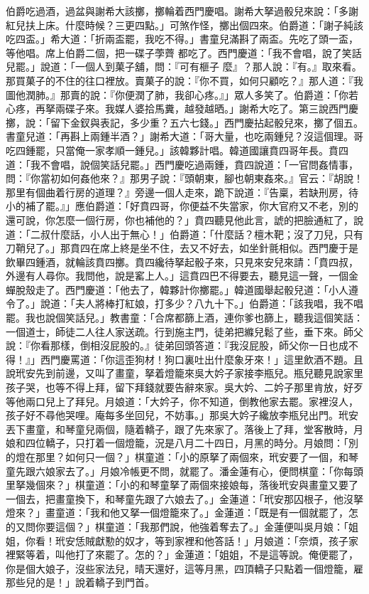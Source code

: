 \begin{showcontents}{}
伯爵吃過酒，過盆與謝希大該擲，擲輪着西門慶唱。謝希大拏過骰兒來說：「多謝紅兒扶上床。什麼時候？三更四點。」可煞作怪，擲出個四來。伯爵道：「謝子純該吃四盃。」希大道：「折兩盃罷，我吃不得。」書童兒滿斟了兩盃。先吃了頭一盃，等他唱。席上伯爵二個，把一碟子荸薺 都吃了。西門慶道：「我不會唱，說了笑話兒罷。」說道：「一個人到菓子舖，問：『可有榧子 麼』？那人說：『有。』取來看。那買菓子的不住的往口裡放。賣菓子的說：『你不買，如何只顧吃？』那人道：『我圖他潤肺。』那賣的說：『你便潤了肺，我卻心疼。』」眾人多笑了。伯爵道：「你若心疼，再拏兩碟子來。我媒人婆拾馬糞，越發越晒。」謝希大吃了。第三說西門慶擲，說：「留下金釵與表記，多少重？五六七錢。」西門慶拈起骰兒來，擲了個五。書童兒道：「再斟上兩鍾半酒？」謝希大道：「哥大量，也吃兩鍾兒？沒這個理。哥吃四鍾罷，只當俺一家孝順一鍾兒。」該韓夥計唱。韓道國讓賁四哥年長。賁四道：「我不會唱，說個笑話兒罷。」西門慶吃過兩鍾，賁四說道：「一官問姦情事，問：『你當初如何姦他來？』那男子說：『頭朝東，腳也朝東姦來。』官云：『胡說！那里有個曲着行房的道理？』旁邊一個人走來，跪下說道：『告稟，若缺刑房，待小的補了罷。』」應伯爵道：「好賁四哥，你便益不失當家，你大官府又不老，別的還可說，你怎麼一個行房，你也補他的？」賁四聽見他此言，諕的把臉通紅了，說道：「二叔什麼話，小人出于無心！」伯爵道：「什麼話？檀木靶；沒了刀兒，只有刀鞘兒了。」那賁四在席上終是坐不住，去又不好去，如坐針氈相似。西門慶于是飲畢四鍾酒，就輪該賁四擲。賁四纔待拏起骰子來，只見來安兒來請：「賁四叔，外邊有人尋你。我問他，說是窰上人。」這賁四巴不得要去，聽見這一聲，一個金蟬脫殼走了。西門慶道：「他去了，韓夥計你擲罷。」韓道國舉起骰兒道：「小人遵令了。」說道：「夫人將棒打紅娘，打多少？八九十下。」伯爵道：「該我唱，我不唱罷。我也說個笑話兒。」教書童：「合席都篩上酒，連你爹也篩上，聽我這個笑話：一個道士，師徒二人往人家送疏。行到施主門，徒弟把縧兒鬆了些，垂下來。師父說：『你看那樣，倒相沒屁股的。』徒弟回頭答道：『我沒屁股，師父你一日也成不得！』」西門慶罵道：「你這歪狗材！狗口裏吐出什麼象牙來！」這里飲酒不題。且說玳安先到前邊，又叫了畫童，拏着燈籠來吳大妗子家接李瓶兒。瓶兒聽見說家里孩子哭，也等不得上拜，留下拜錢就要告辭來家。吳大妗、二妗子那里肯放，好歹等他兩口兒上了拜兒。月娘道：「大妗子，你不知道，倒教他家去罷。家裡沒人，孩子好不尋他哭哩。庵每多坐回兒，不妨事。」那吳大妗子纔放李瓶兒出門。玳安丟下畫童，和琴童兒兩個，隨着轎子，跟了先來家了。落後上了拜，堂客散時，月娘和四位轎子，只打着一個燈籠，況是八月二十四日，月黑的時分。月娘問：「別的燈在那里？如何只一個？」棋童道：「小的原拏了兩個來，玳安要了一個，和琴童先跟六娘家去了。」月娘冷帳更不問，就罷了。潘金蓮有心，便問棋童：「你每頭里拏幾個來？」棋童道：「小的和琴童拏了兩個來接娘每，落後玳安與畫童又要了一個去，把畫童換下，和琴童先跟了六娘去了。」金蓮道：「玳安那囚根子，他沒拏燈來？」畫童道：「我和他又拏一個燈籠來了。」金蓮道：「既是有一個就罷了，怎的又問你要這個？」棋童道：「我那們說，他強着奪去了。」金蓮便叫吳月娘：「姐姐，你看！玳安恁賊獻懃的奴才，等到家裡和他答話！」月娘道：「奈煩，孩子家裡緊等着，叫他打了來罷了。怎的？」金蓮道：「姐姐，不是這等說。俺便罷了，你是個大娘子，沒些家法兒，晴天還好，這等月黑，四頂轎子只點着一個燈籠，雇那些兒的是！」說着轎子到門首。
\end{showcontents}
